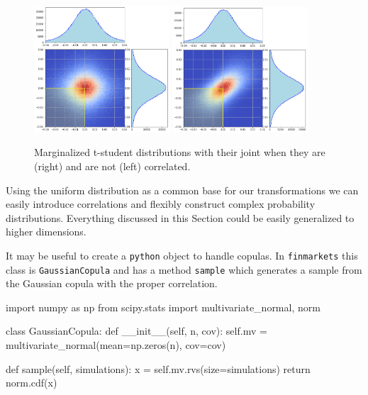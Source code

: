 \begin{figure}[htbp]
\centering
\includegraphics[width=0.45\textwidth]{figures/bmw_sie_uncorrelated}
\quad
\includegraphics[width=0.45\textwidth]{figures/bmw_sie_correlated}
\caption{Marginalized t-student distributions with their joint when they are (right) and are not (left) correlated.}
\label{fig:bmw_sie_with_corr}
\end{figure}
    
Using the uniform distribution as a common base for our transformations we can easily introduce correlations and flexibly construct complex probability distributions. Everything discussed in this Section could be easily generalized to higher dimensions.

\begin{finmarkets}
It may be useful to create a \texttt{python} object to handle copulas. In \texttt{finmarkets} this class is \texttt{GaussianCopula} and has a method \texttt{sample} which generates a sample from the Gaussian copula with the proper correlation.
\end{finmarkets}
\begin{ipython}
import numpy as np
from scipy.stats import multivariate_normal, norm

class GaussianCopula:
    def __init__(self, n, cov):
        self.mv = multivariate_normal(mean=np.zeros(n), cov=cov)

    def sample(self, simulations):
        x = self.mv.rvs(size=simulations)
        return norm.cdf(x)
\end{ipython}

